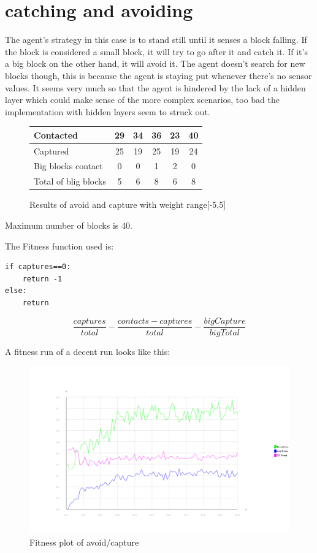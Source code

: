 \documentclass[12pt, a4paper]{article}
\begin{document}
\section{catching and avoiding}
The agent's strategy in this case is to stand still until it senses a block falling. If the block is considered a small block, it will try to go after it and catch it. If it's a big block on the other hand, it will avoid it. The agent doesn't search for new blocks though, this is because the agent is staying put whenever there's no sensor values. It seems very much so that the agent is hindered by the lack of a hidden layer which could make sense of the more complex scenarios, too bad the implementation with hidden layers seem to struck out. 
\begin{figure}[H]
	\begin{center}
		\begin{tabular}{l | c | c |c |c |c }
		 Contacted& 29 & 34 & 36 & 23 & 40\\ \hline
		 Captured & 25 & 19 & 25 & 19 & 24\\ \hline
		Big blocks contact &0 & 0& 1 & 2 &0 \\ \hline
		Total of blig blocks  &5 & 6 & 8 & 6 & 8\\ 
		\end{tabular}
	\end{center}
	\caption{Results of avoid and capture with weight range[-5,5]}
\end{figure}
Maximum number of blocks is 40.

The Fitness function used is: 
\begin{verbatim}
if captures==0:
    return -1
else:
    return
	\end{verbatim}
    $$\frac{captures}{total}-\frac{contacts-captures}{total}-\frac{bigCapture}{bigTotal}$$



A fitness run of a decent run looks like this:
\begin{figure}[H]
\includegraphics[width=\linewidth]{catch_avoid_dump}
\caption{Fitness plot of avoid/capture}
\end{figure}
\end{document}
